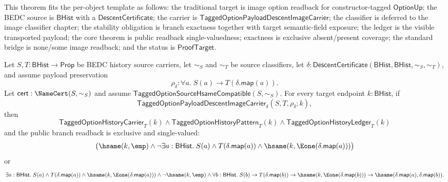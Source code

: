 \begin{theorem}
\label{thm:tagged-option-payload-descent-image-public-readback-single-valued}
This theorem fits the per-object template as follows: the traditional target is
image option readback for constructor-tagged $\mathsf{OptionUp}$; the BEDC
source is $\mathsf{BHist}$ with a
$\mathsf{DescentCertificate}$; the carrier is
$\mathsf{TaggedOptionPayloadDescentImageCarrier}$; the classifier is deferred
to the image classifier chapter; the stability obligation is branch exactness
together with target semantic-field exposure; the ledger is the visible
transported payload; the core theorem is public readback single-valuedness;
exactness is exclusive absent/present coverage; the standard bridge is
none/some image readback; and the status is $\mathsf{ProofTarget}$.

Let $S,T:\mathsf{BHist}\to\mathsf{Prop}$ be BEDC history source carriers, let
$\sim_S$ and $\sim_T$ be source classifiers, let
$\delta:\mathsf{DescentCertificate}(\mathsf{BHist},\mathsf{BHist},\sim_S,\sim_T)$,
and assume payload preservation
$$
\rho_{\delta}:\forall a.\;S(a)\to T(\delta.\mathsf{map}(a)).
$$
Let $\mathsf{cert}:\NameCert(S,\sim_S)$ and assume
$\mathsf{TaggedOptionSourceHsameCompatible}(S,\sim_S)$. For every target
endpoint $k:\mathsf{BHist}$, if
$$
\mathsf{TaggedOptionPayloadDescentImageCarrier}_{\delta}
(S,T,\rho_{\delta};k),
$$
then
$$
\mathsf{TaggedOptionHistoryCarrier}_T(k)\land
\mathsf{TaggedOptionHistoryPattern}_T(k)\land
\mathsf{TaggedOptionHistoryLedger}_T(k)
$$
and the public branch readback is exclusive and single-valued:
$$
\bigl(\hsame(k,\emp)\land
\neg\exists a:\mathsf{BHist}.\;
S(a)\land T(\delta.\mathsf{map}(a))\land
\hsame(k,\Eone(\delta.\mathsf{map}(a)))\bigr)
$$
or
$$
\exists a:\mathsf{BHist}.\;
S(a)\land T(\delta.\mathsf{map}(a))\land
\hsame(k,\Eone(\delta.\mathsf{map}(a)))\land
\neg\hsame(k,\emp)\land
\forall b:\mathsf{BHist}.\;
S(b)\to T(\delta.\mathsf{map}(b))\to
\hsame(k,\Eone(\delta.\mathsf{map}(b)))\to
\hsame(\delta.\mathsf{map}(a),\delta.\mathsf{map}(b)).
$$
\end{theorem}
